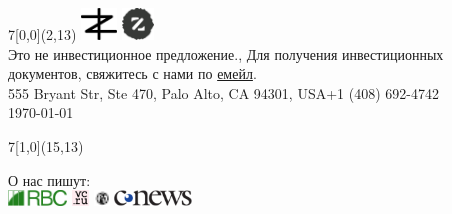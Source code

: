 \documentclass{deck}
\begin{document}
\setlength{\parindent}{0pt} %

\setlength{\fboxsep}{2pt}
\newcommand\point[2]{\vbox{\raggedright\small%
  \fcolorbox{zgreen}{white}{\color{zgreen}#1}\newline%
  \footnotesize#2\vspace{16pt}}}
\newcommand\highlight[1]{\colorbox{zgreen}{\color{white}\thinspace{#1}\thinspace}}

\begin{textblock}{7}[0,0](2,13){
  \color{gray}\footnotesize
  \includegraphics[height=24pt]{../images/zerocracy-logo.pdf}
  \includegraphics[height=24pt]{../images/logo.pdf}\\
  Это не инвестиционное предложение.,
  Для получения инвестиционных документов, свяжитесь с нами по \href{mailto:cio@zerocracy.com}{емейл}.\\
  555 Bryant Str, Ste 470, Palo Alto, CA 94301, USA\quad+1 (408) 692-4742\\
  \today\quad\zoldversion
}\end{textblock}

\begin{textblock}{7}[1,0](15,13){\begin{flushright}
  \color{gray}\footnotesize
  О нас пишут:\\
  \href{https://www.rbc.ru/crypto/news/5c0f98a79a79479329c12358}{\includegraphics[height=12pt]{../images/rbc-logo.pdf}}
  \quad
  \href{https://vc.ru/life/53597-pochemu-proekty-pod-upravleniem-robota-v-3-raza-rentabelnee}{\includegraphics[height=12pt]{../images/vcru-logo.pdf}}
  \quad
  \href{https://www.kommersant.ru/doc/3811862}{\includegraphics[height=12pt]{../images/kommersant-logo.pdf}}
  \quad
  \href{http://www.cnews.ru/news/line/2018-12-05_zerocracy_zapustila_kriptovalyutu_zold_dlya_mikroplatezhej}{\includegraphics[height=12pt]{../images/cnews-logo.pdf}}
\end{flushright}}\end{textblock}
\end{document}
